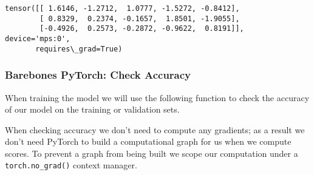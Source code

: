 \documentclass[11pt]{article}
\makeatletter
\newcommand{\boxspacing}{\kern\kvtcb@left@rule\kern\kvtcb@boxsep}
\newcommand{\prompt}[4]{
        {\ttfamily\llap{{\color{#2}[#3]:\hspace{3pt}#4}}\vspace{-\baselineskip}}
    }
\makeatother
\begin{document}
            \begin{tcolorbox}[breakable, size=fbox, boxrule=.5pt, pad at break*=1mm, opacityfill=0]
\prompt{Out}{outcolor}{8}{\boxspacing}
\begin{Verbatim}[commandchars=\\\{\}]
tensor([[ 1.6146, -1.2712,  1.0777, -1.5272, -0.8412],
        [ 0.8329,  0.2374, -0.1657,  1.8501, -1.9055],
        [-0.4926,  0.2573, -0.2872, -0.9622,  0.8191]], device='mps:0',
       requires\_grad=True)
\end{Verbatim}
\end{tcolorbox}
        
    \hypertarget{barebones-pytorch-check-accuracy}{%
\subsubsection{Barebones PyTorch: Check
Accuracy}\label{barebones-pytorch-check-accuracy}}

When training the model we will use the following function to check the
accuracy of our model on the training or validation sets.

When checking accuracy we don't need to compute any gradients; as a
result we don't need PyTorch to build a computational graph for us when
we compute scores. To prevent a graph from being built we scope our
computation under a \texttt{torch.no\_grad()} context manager.
\end{document}
